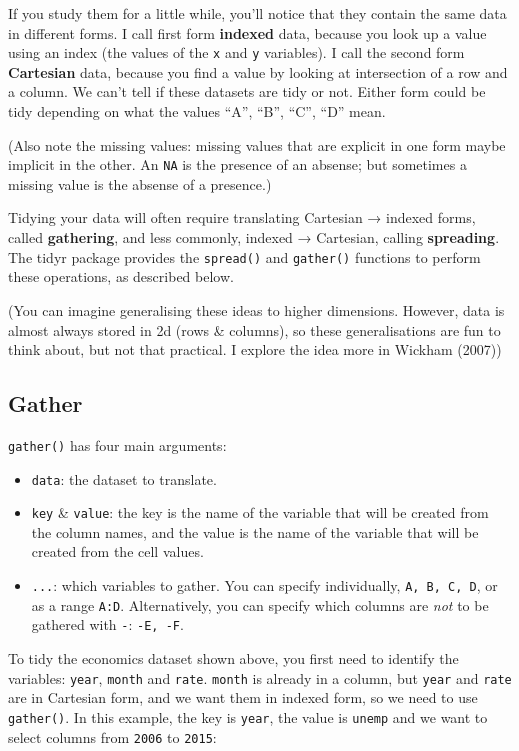 If you study them for a little while, you'll notice that they contain
the same data in different forms. I call first form \textbf{indexed}
data, because you look up a value using an index (the values of the
\texttt{x} and \texttt{y} variables). I call the second form
\textbf{Cartesian} data, because you find a value by looking at
intersection of a row and a column. We can't tell if these datasets are
tidy or not. Either form could be tidy depending on what the values
``A'', ``B'', ``C'', ``D'' mean.

(Also note the missing values: missing values that are explicit in one
form maybe implicit in the other. An \texttt{NA} is the presence of an
absense; but sometimes a missing value is the absense of a presence.)

Tidying your data will often require translating Cartesian → indexed
forms, called \textbf{gathering}, and less commonly, indexed →
Cartesian, calling \textbf{spreading}. The tidyr package provides the
\texttt{spread()} and \texttt{gather()} functions to perform these
operations, as described below.

(You can imagine generalising these ideas to higher dimensions. However,
data is almost always stored in 2d (rows \& columns), so these
generalisations are fun to think about, but not that practical. I
explore the idea more in Wickham (2007))

\subsection{Gather}

\texttt{gather()} has four main arguments: 

\begin{itemize}
\item
  \texttt{data}: the dataset to translate.
\item
  \texttt{key} \& \texttt{value}: the key is the name of the variable
  that will be created from the column names, and the value is the name
  of the variable that will be created from the cell values.
\item
  \texttt{...}: which variables to gather. You can specify individually,
  \texttt{A,\ B,\ C,\ D}, or as a range \texttt{A:D}. Alternatively, you
  can specify which columns are \emph{not} to be gathered with
  \texttt{-}: \texttt{-E,\ -F}.
\end{itemize}

To tidy the economics dataset shown above, you first need to identify
the variables: \texttt{year}, \texttt{month} and \texttt{rate}.
\texttt{month} is already in a column, but \texttt{year} and
\texttt{rate} are in Cartesian form, and we want them in indexed form,
so we need to use \texttt{gather()}. In this example, the key is
\texttt{year}, the value is \texttt{unemp} and we want to select columns
from \texttt{2006} to \texttt{2015}:

